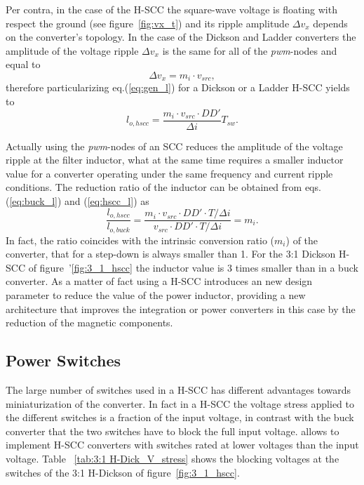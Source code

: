 Per contra, in the case of the H-SCC the square-wave voltage is floating with respect the ground (see figure~\ref{fig:vx_t}) and its ripple amplitude $\Delta v_x$ depends on the converter's topology. In the case of the Dickson and Ladder converters the amplitude of the voltage ripple $\Delta v_x$ is the same for all of the \emph{pwm}-nodes and equal to
\begin{equation}
 \Delta v_x   = m_i \cdot v_{src},
\label{eq:h_scc_Del_vx}
\end{equation}
therefore particularizing eq.(\ref{eq:gen_l}) for a Dickson or a Ladder H-SCC yields to
\begin{equation}
 l_{o,hscc}  = \frac{ m_i \cdot v_{src} \cdot DD'}{\Delta i} T_{sw}.
\label{eq:hscc_l}
\end{equation}

Actually using the \emph{pwm}-nodes of an SCC reduces the amplitude of the voltage ripple at the filter inductor, what at the same time requires a smaller inductor value for a converter operating under the same frequency and current ripple conditions. The reduction ratio of the inductor can be obtained from eqs. (\ref{eq:buck_l}) and (\ref{eq:hscc_l}) as
\begin{equation}
 \frac{l_{o,hscc}}{l_{o,buck}} =  \frac{{ m_i \cdot v_{src} \cdot DD' \cdot T}/{\Delta i} }{{  v_{src} \cdot DD' \cdot T}/{\Delta i}} = m_i.
\label{eq:l_m}
\end{equation}
In fact, the ratio coincides with the intrinsic conversion ratio ($m_i$) of the converter, that for a step-down is always smaller than 1. For the 3:1 Dickson H-SCC of figure~'\ref{fig:3_1_hscc} the inductor value is 3 times smaller than in a buck converter. As a matter of fact using a H-SCC introduces an new design parameter to reduce the value of the power inductor, providing a new architecture that improves the integration or power converters in this case by the reduction of the magnetic components.



\subsection{Power Switches}
The large number of switches used in a H-SCC has different advantages towards miniaturization of the converter. In fact in a H-SCC the voltage stress applied to the different switches is a fraction of the input voltage, in contrast with the buck converter that the two switches have to block the full input voltage.  allows to implement H-SCC converters with switches rated at lower voltages than the input voltage. Table ~\ref{tab:3:1 H-Dick_V_stress} shows the blocking voltages at the switches of the 3:1 H-Dickson of figure~\ref{fig:3_1_hscc}.

